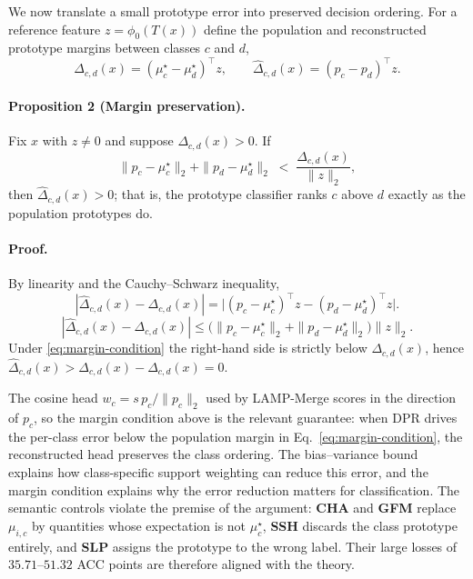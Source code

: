 \documentclass[letterpaper]{article}
\theoremstyle{definition}
\theoremstyle{plain}
\begin{document}
We now translate a small prototype error into preserved decision ordering. For a reference feature $z=\phi_0(T(x))$ define the population and reconstructed prototype margins between classes $c$ and $d$,
\begin{equation}
\Delta_{c,d}(x)=(\mu_c^{\star}-\mu_d^{\star})^{\top}z,\qquad
\widehat{\Delta}_{c,d}(x)=(p_c-p_d)^{\top}z .
\end{equation}

\paragraph{Proposition 2 (Margin preservation).}
\label{prop:margin}
Fix $x$ with $z\neq0$ and suppose $\Delta_{c,d}(x)>0$. If
\begin{equation}
\|p_c-\mu_c^{\star}\|_2+\|p_d-\mu_d^{\star}\|_2
\;<\;\frac{\Delta_{c,d}(x)}{\|z\|_2},
\label{eq:margin-condition}
\end{equation}
then $\widehat{\Delta}_{c,d}(x)>0$; that is, the prototype classifier ranks $c$ above $d$ exactly as the population prototypes do.

\paragraph{Proof.}
By linearity and the Cauchy--Schwarz inequality,
\begin{equation}
|\widehat{\Delta}_{c,d}(x)-\Delta_{c,d}(x)|
=\big|(p_c-\mu_c^{\star})^{\top}z-(p_d-\mu_d^{\star})^{\top}z\big|.
\end{equation}
\begin{equation}
|\widehat{\Delta}_{c,d}(x)-\Delta_{c,d}(x)|
\le\big(\|p_c-\mu_c^{\star}\|_2+\|p_d-\mu_d^{\star}\|_2\big)\|z\|_2 .
\end{equation}
Under \eqref{eq:margin-condition} the right-hand side is strictly below $\Delta_{c,d}(x)$, hence $\widehat{\Delta}_{c,d}(x)>\Delta_{c,d}(x)-\Delta_{c,d}(x)=0$.

The cosine head \(w_c=s\,p_c/\|p_c\|_2\) used by LAMP-Merge scores in the direction of \(p_c\), so the margin condition above is the relevant guarantee: when DPR drives the per-class error below the population margin in Eq.~\eqref{eq:margin-condition}, the reconstructed head preserves the class ordering. The bias--variance bound explains how class-specific support weighting can reduce this error, and the margin condition explains why the error reduction matters for classification. The semantic controls violate the premise of the argument: \textbf{CHA} and \textbf{GFM} replace \(\mu_{i,c}\) by quantities whose expectation is not \(\mu_c^{\star}\), \textbf{SSH} discards the class prototype entirely, and \textbf{SLP} assigns the prototype to the wrong label. Their large losses of \(35.71\)--\(51.32\) ACC points are therefore aligned with the theory.
\end{document}
